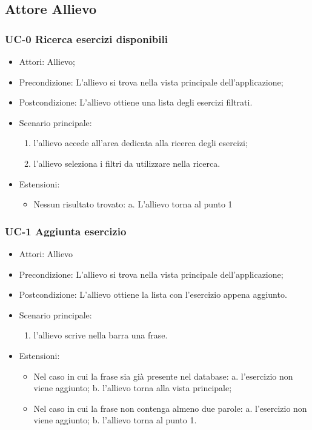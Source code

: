 \subsection{Attore Allievo}
	\subsubsection{UC-0 Ricerca esercizi disponibili}
		\begin{itemize}
			\item Attori: Allievo;
			\item Precondizione: L'allievo si trova nella vista principale dell'applicazione;
			\item Postcondizione: L'allievo ottiene una lista degli esercizi filtrati.
			\item Scenario principale:
				\begin{enumerate}
					\item l'allievo accede all'area dedicata alla ricerca degli esercizi;
					\item l'allievo seleziona i filtri da utilizzare nella ricerca.
				\end{enumerate}
			\item Estensioni:
				\begin{itemize}
					\item Nessun risultato trovato:
						a. L'allievo torna al punto 1
				\end{itemize}
		\end{itemize}
	\subsubsection{UC-1 Aggiunta esercizio}
		\begin{itemize}
			\item Attori: Allievo
			\item Precondizione: L'allievo si trova nella vista principale dell'applicazione;
			\item Postcondizione: L'allievo ottiene la lista con l'esercizio appena aggiunto.
			\item Scenario principale:
				\begin{enumerate}
					\item l'allievo scrive nella barra una frase.
				\end{enumerate}
			\item Estensioni:
				\begin{itemize}
					\item Nel caso in cui la frase sia già presente nel database:
						a. l'esercizio non viene aggiunto;
						b. l'allievo torna alla vista principale;
					\item Nel caso in cui la frase non contenga almeno due parole:
						a. l'esercizio non viene aggiunto;
						b. l'allievo torna al punto 1.
				\end{itemize}
			\end{itemize}
